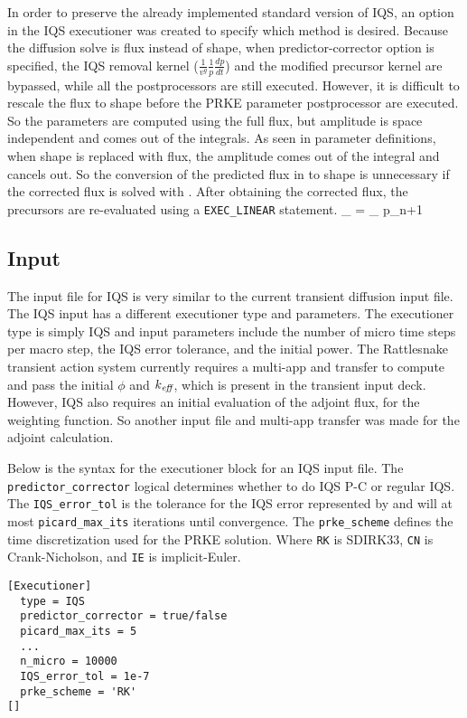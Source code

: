 In order to preserve the already implemented standard version of IQS, an option in the IQS executioner was created to specify which method is desired.  Because the diffusion solve is flux instead of shape, when predictor-corrector option is specified, the IQS removal kernel ($\frac{1}{v^g}\frac{1}{p}\frac{dp}{dt}$) and the modified precursor kernel are bypassed, while all the postprocessors are still executed.  However, it is difficult to rescale the flux to shape before the PRKE parameter postprocessor are executed.  So the parameters are computed using the full flux, but amplitude is space independent and comes out of the integrals.  As seen in parameter definitions, when shape is replaced with flux, the amplitude comes out of the integral and cancels out.  So the conversion of the predicted flux in   to shape is unnecessary if the corrected flux is solved with .  After obtaining the corrected flux, the precursors are re-evaluated using a \texttt{EXEC\_LINEAR} statement.
\be
{}_{} = _{}  p_{n+1}
\label{eq:phicorr2}
\ee

\subsection{Input}

The input file for IQS is very similar to the current transient diffusion input file.  The IQS input has a different executioner type and parameters.  The executioner type is simply IQS and input parameters include the number of micro time steps per macro step, the IQS error tolerance, and the initial power.  The Rattlesnake transient action system currently requires a multi-app and transfer to compute and pass the initial $\phi$ and $k_\textit{eff}$, which is present in the transient input deck.  However, IQS also requires an initial evaluation of the adjoint flux, for the weighting function.  So another input file and multi-app transfer was made for the adjoint calculation.  \vspace{3mm}

Below is the syntax for the executioner block for an IQS input file.  The \texttt{predictor\_corrector} logical determines whether to do IQS P-C or regular IQS.  The \texttt{IQS\_error\_tol} is the tolerance for the IQS error represented by  and will at most \texttt{picard\_max\_its} iterations until convergence.  The \texttt{prke\_scheme} defines the time discretization used for the PRKE solution. Where \texttt{RK} is SDIRK33, \texttt{CN} is Crank-Nicholson, and \texttt{IE} is implicit-Euler.
\begin{lstlisting}
[Executioner]
  type = IQS
  predictor_corrector = true/false
  picard_max_its = 5
  ...
  n_micro = 10000
  IQS_error_tol = 1e-7
  prke_scheme = 'RK'
[]
\end{lstlisting}

